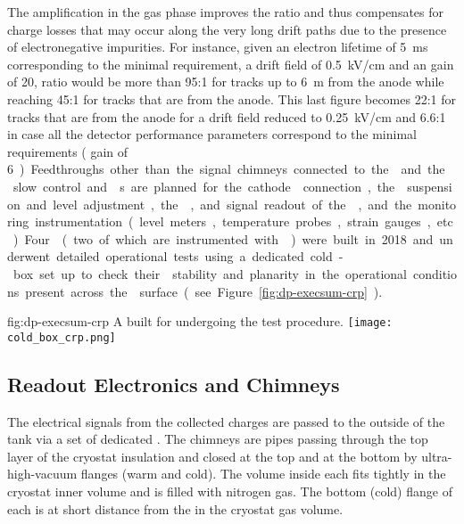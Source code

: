 The amplification in the gas phase improves the  ratio and thus compensates for charge losses that may occur along the very long drift paths due to the presence of  electronegative impurities.  For instance, given an electron lifetime of \SI{5}{ms} corresponding to the minimal requirement,  a drift field of \SI{0.5}{kV/cm} and an  gain of \num{20},  ratio would be more than  \num{95}:\num{1} for tracks up to \SI{6}{m} from the anode while reaching  \num{45}:\num{1} for   tracks that are \dpmaxdrift from the anode. This last figure becomes  \num{22}:\num{1} for   tracks that are \dpmaxdrift from the anode for a drift field reduced to  \SI{0.25}{kV/cm} and \num{6.6}:\num{1} in case all the detector performance parameters correspond to the minimal requirements ( gain of  \SI{6}).

Feedthroughs other than the signal chimneys connected to the  and the  slow control and \fdth{}s are planned for the cathode  connection, the  suspension and level adjustment, the , and signal readout of the , and the monitoring instrumentation (level meters, temperature probes, strain gauges, etc.).

Four  (two of which are instrumented with ) were built in 2018 and underwent detailed operational tests using a dedicated cold-box set up to check their  stability and planarity in the operational conditions present across the  surface (see Figure~\ref{fig:dp-execsum-crp}). 

\begin{dunefigure}{fig:dp-execsum-crp}
  {A   built for  undergoing the \coldbox test procedure.}
  \texttt{[image: cold\_box\_crp.png]}
\end{dunefigure}


\subsection{Readout Electronics and Chimneys}
\label{sec:dp-execsum-electronics}

The electrical signals from the collected charges are passed to the outside of the tank via a set of dedicated . The chimneys are pipes passing through the top layer of the cryostat insulation and closed at the top and at the bottom by ultra-high-vacuum flanges (warm and cold). The volume inside each  fits tightly in the cryostat inner volume and is filled with nitrogen gas. The bottom (cold) flange of each  is at short distance  from the  in the cryostat gas volume.

